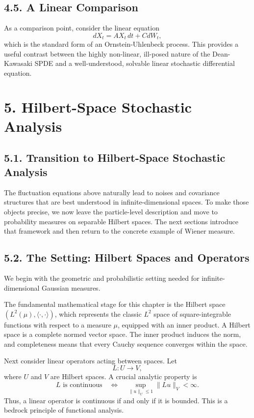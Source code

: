 \documentclass[11pt]{article}
\theoremstyle{definition}
\theoremstyle{remark}
\begin{document}
\subsection*{4.5. A Linear Comparison}
As a comparison point, consider the linear equation
\[
dX_t=AX_t\,dt+CdW_t,
\]
which is the standard form of an Ornstein-Uhlenbeck process. This provides a useful contrast between the highly non-linear, ill-posed nature of the Dean-Kawasaki SPDE and a well-understood, solvable linear stochastic differential equation.

\section*{5. Hilbert-Space Stochastic Analysis}
\subsection*{5.1. Transition to Hilbert-Space Stochastic Analysis}
The fluctuation equations above naturally lead to noises and covariance structures that are best understood in infinite-dimensional spaces. To make those objects precise, we now leave the particle-level description and move to probability measures on separable Hilbert spaces. The next sections introduce that framework and then return to the concrete example of Wiener measure.

\subsection*{5.2. The Setting: Hilbert Spaces and Operators}
We begin with the geometric and probabilistic setting needed for infinite-dimensional Gaussian measures.

The fundamental mathematical stage for this chapter is the Hilbert space $(L^2(\mu),\langle\cdot,\cdot\rangle)$, which represents the classic $L^2$ space of square-integrable functions with respect to a measure $\mu$, equipped with an inner product. A Hilbert space is a complete normed vector space. The inner product induces the norm, and completeness means that every Cauchy sequence converges within the space.

Next consider linear operators acting between spaces. Let
\[
L:U\to V,
\]
where $U$ and $V$ are Hilbert spaces. A crucial analytic property is
\[
L \text{ is continuous}
\quad\Longleftrightarrow\quad
\sup_{\|u\|_U\le 1}\|Lu\|_V<\infty.
\]
Thus, a linear operator is continuous if and only if it is bounded. This is a bedrock principle of functional analysis.
\end{document}

